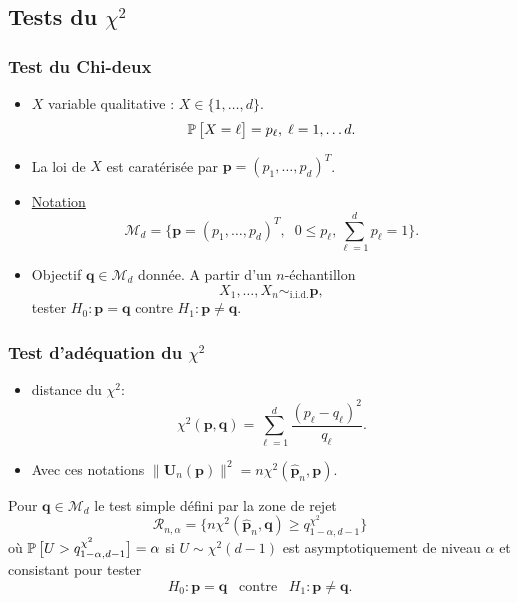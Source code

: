 \subsection{Tests du $\chi^2$}

\begin{frame}
\frametitle{Test du Chi-deux}
\begin{itemize}
\item $X$ variable \alert{qualitative} : $X \in \{1,\ldots, d\}$.
$$\operatorname{{\mathbb P}}\big[X=\ell\big]=p_\ell,\;\ell=1,\ldots d.$$
\item La loi de $X$ est caratérisée par ${\boldsymbol p} = (p_1,\ldots, p_d)^T$.
\item \underline{Notation}
$${\mathcal M}_d  = \big\{{\boldsymbol p}=(p_1,\ldots, p_d)^T,\;\;0 \leq p_\ell,\sum_{\ell=1}^dp_\ell=1\big\}.$$
\item \alert{Objectif} ${\boldsymbol q}\in {\mathcal M}_d$ donnée. A partir d'un $n$-échantillon
$$X_1,\ldots, X_n \sim_{\text{i.i.d.}}{\boldsymbol p},$$
tester
$H_0:{\boldsymbol p}={\boldsymbol q}$ \alert{contre} $H_1:{\boldsymbol p}\neq{\boldsymbol q}.$
\end{itemize}
\end{frame}




\begin{frame}
\frametitle{Test d'adéquation du $\chi^2$}
\begin{itemize}
\item  distance du $\chi^2$:
$$\chi^2(\boldsymbol{p},\boldsymbol{q})=\sum_{\ell=1}^d \frac{(p_\ell-q_\ell)^2}{q_\ell}.$$
\item Avec ces notations
$\|{\boldsymbol U}_n(\boldsymbol{p})\|^2=n\chi^2(\widehat {\boldsymbol p}_n,\boldsymbol{p}).$
\end{itemize}
\begin{prop}
Pour $\boldsymbol{q} \in {\mathcal M}_d$ le test simple défini par la zone de rejet
$${\mathcal R}_{n,\alpha} = \big\{n\chi^2(\widehat {\boldsymbol p}_n,\boldsymbol{q}) \geq q_{1-\alpha,d-1}^{\chi^2} \big\}$$
où
$\operatorname{{\mathbb P}}\big[U > q_{1-\alpha,d-1}^{\chi^2}\big]=\alpha$ si $U \sim \chi^2(d-1)$ est
\alert{asymptotiquement de niveau $\alpha$ et consistant} pour tester
$$H_0:\boldsymbol{p}=\boldsymbol{q}\;\;\;\text{contre}\;\;\;
H_1:\boldsymbol{p}\neq\boldsymbol{q}.$$
\end{prop}
\end{frame}

